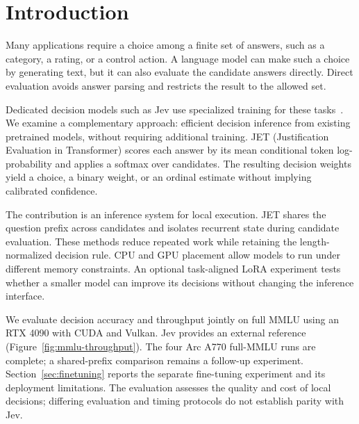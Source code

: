 \section{Introduction}
\label{sec:introduction}
Many applications require a choice among a finite set of answers, such as a
category, a rating, or a control action. A language model can make such a choice
by generating text, but it can also evaluate the candidate answers directly.
Direct evaluation avoids answer parsing and restricts the result to the allowed
set.

Dedicated decision models such as Jev use specialized training for these
tasks~\cite{jev-introduction}. We examine a complementary approach: efficient
decision inference from existing pretrained models, without requiring additional training.
JET (Justification Evaluation in Transformer) scores each answer by its
mean conditional token log-probability and applies a softmax over candidates.
The resulting decision weights yield a choice, a binary weight, or an ordinal
estimate without implying calibrated confidence.

The contribution is an inference system for local execution. JET shares the
question prefix across candidates and isolates recurrent state during candidate
evaluation. These methods
reduce repeated work while retaining the length-normalized decision rule.
CPU and GPU placement allow models to run under different memory constraints.
An optional task-aligned LoRA experiment tests whether a smaller model can
improve its decisions without changing the inference interface.

We evaluate decision accuracy and throughput jointly on full MMLU using
an RTX 4090 with CUDA and Vulkan. Jev provides an external reference
(Figure~\ref{fig:mmlu-throughput}). The four Arc A770 full-MMLU runs are
complete; a shared-prefix comparison remains a follow-up experiment.
Section~\ref{sec:finetuning} reports the separate fine-tuning experiment and
its deployment limitations.
The evaluation assesses the quality and cost of local decisions; differing
evaluation and timing protocols do not establish parity with Jev.
